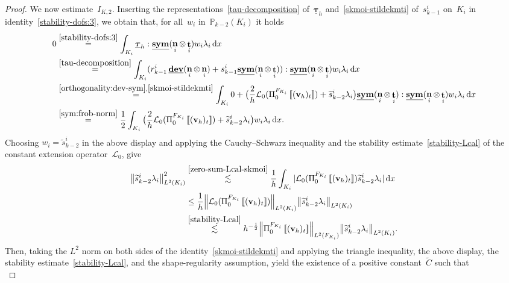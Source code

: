 \documentclass[a4paper,twoside,10pt]{article}
\theoremstyle{plain}
\theoremstyle{remark}
\theoremstyle{definition}
\numberwithin{equation}{section}
\numberwithin{figure}{section}
\newcommand{\Norm}[1]{{\left\|{#1} \right\|}}
\newcommand{\jump}[1]{\left[\!\left[#1\right]\!\right]}
\newcommand{\Pbbkmt}{\mathbb{P}_{k-2}}
\newcommand{\K}{K}
\newcommand{\F}{F}
\newcommand{\taubfh}{\underline{\boldsymbol{\tau}}_h}
\newcommand{\vbfh}{\mathbf{v}_h}
\DeclareMathOperator{\dev}{\underline{\mathbf{dev}}}
\newcommand{\sym}{\underline{\bf{sym}}}
\DeclareMathOperator{\norm}{\bf{n}}
\DeclareMathOperator{\tang}{\bf{t}}
\newcommand{\tangscalar}{t}
\newcommand{\Ltwo}{L^2}
\newcommand{\dx}{\, \mathrm{d}x}
\newcommand{\stildekmt}{\widetilde{s}_{k-2}}
\newcommand{\stildekmti}{\stildekmt^i}
\newcommand{\lambdai}{\lambda_i}
\newcommand{\rkmoi}{r_{k-1}^i}
\newcommand{\skmoi}{s_{k-1}^i}
\newcommand{\Ki}{{\K_i}}
\newcommand{\Fi}{{\F_{\Ki}}}
\newcommand{\normi}{\norm_i}
\newcommand{\tangi}{\tang_i}
\newcommand{\PizFi}{\Pi_0^{\Fi}}
\newcommand{\Ctilde}{\widetilde{C}}
\newcommand{\IKtwo}{I_{\K,2}}
\newcommand{\Lcalzero}{\mathcal{L}_0}
\newcommand{\wi}{w_i}
\begin{document}
\begin{proof}
We now estimate~$\IKtwo$.
Inserting the representations~\eqref{tau-decomposition} of~$\taubfh$
and~\eqref{skmoi-stildekmti} of~$\skmoi$ on~$\Ki$
in identity~\eqref{stability-dofs:3},
we obtain that,
for all~$\wi$ in~$\Pbbkmt(\Ki)$
it holds
\begin{equation} \label{zero-sum-Lcal-skmoi}
\begin{split}
0
&\overset{\eqref{stability-dofs:3}}{=}
\int_{\Ki} \taubfh : \sym(\normi\otimes\tangi)\wi\lambdai \dx \\
&\overset{\eqref{tau-decomposition}}{=}
\int_{\Ki} (\rkmoi\dev(\normi\otimes\normi) + \skmoi\sym(\normi\otimes\tangi)) : \sym(\normi\otimes\tangi)\wi\lambdai \dx \\
&\overset{\eqref{orthogonality:dev-sym},\eqref{skmoi-stildekmti}}{=}
\int_{\Ki} 0 + \big(\frac{2}{h}\Lcalzero(\PizFi\jump{(\vbfh)_{\tangscalar}}) + \stildekmti\lambdai\big) \sym(\normi\otimes\tangi) : \sym(\normi\otimes\tangi)\wi\lambdai \dx \\
&\overset{\eqref{sym:frob-norm}}{=}
\frac12 \int_{\Ki} \big(\frac{2}{h}\Lcalzero(\PizFi\jump{(\vbfh)_{\tangscalar}}) + \stildekmti\lambdai\big)\wi\lambdai \dx.
\end{split}
\end{equation}
Choosing
$\wi = \stildekmti$ in the above display
and applying
the Cauchy--Schwarz inequality
and the stability estimate~\eqref{stability-Lcal} of the constant extension operator~$\Lcalzero$,
give
\begin{equation*}
\begin{split}
\Norm{\stildekmti\lambdai}_{\Ltwo(\Ki)}^2
&\overset{\eqref{zero-sum-Lcal-skmoi}}{\lesssim}
\frac{1}{h}\int_{\Ki}|\Lcalzero(\PizFi\jump{(\vbfh)_{\tangscalar}})\stildekmti\lambdai| \dx \\
&\leq \frac{1}{h}\Norm{\Lcalzero(\PizFi\jump{(\vbfh)_{\tangscalar}})}_{\Ltwo(\Ki)}\Norm{\stildekmti\lambdai}_{\Ltwo(\Ki)} \\
&\overset{\eqref{stability-Lcal}}{\lesssim}
h^{-\frac12}\Norm{\PizFi\jump{(\vbfh)_{\tangscalar}}}_{\Ltwo(\Fi)}\Norm{\stildekmti\lambdai}_{\Ltwo(\Ki)}.
\end{split} 
\end{equation*}
Then,
taking the $\Ltwo$ norm on both sides of the identity~\eqref{skmoi-stildekmti}
and applying 
the triangle inequality,
the above display,
the stability estimate~\eqref{stability-Lcal},
and the shape-regularity assumption,
yield
the existence of a positive constant~$\Ctilde$
such that
\begin{equation} \label{skmoi-leq-PizF}

\end{equation}
\end{proof}
\end{document}
